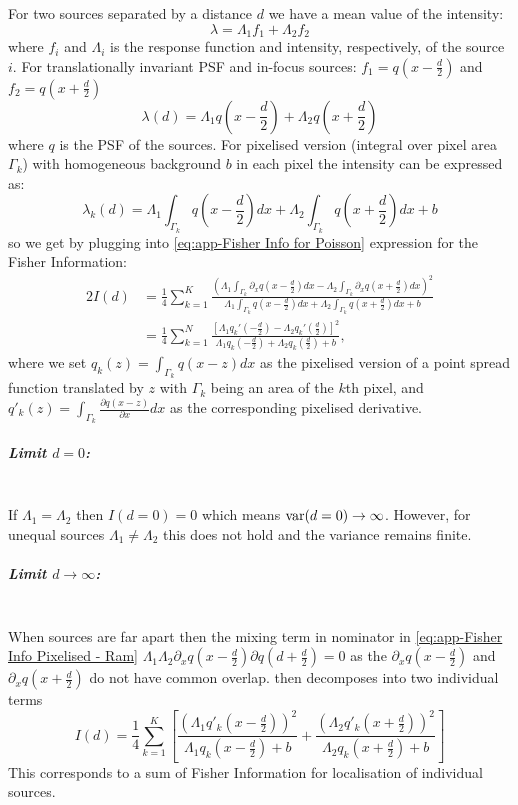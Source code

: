 For two sources separated by a distance $d$ we have a mean value of the intensity:
%
\begin{equation}
	\lambda=\Lambda_1f_1+\Lambda_2f_2
\end{equation}
%
where $f_i$ and $\Lambda_i$ is the response function and intensity, respectively, of the source $i$. For translationally invariant PSF and in-focus sources: $f_1=q(x-\frac{d}{2})$ and $f_2=q(x+\frac{d}{2})$
%
\begin{equation}
	\lambda(d)=\Lambda_1q(x-\frac{d}{2})+\Lambda_2q(x+\frac{d}{2})
	\label{eq:app-expected intensity d/2}
\end{equation}
%
where $q$ is the PSF of the sources. For pixelised version (integral over pixel area $\Gamma_k$) with homogeneous background $b$ in each pixel the intensity can be expressed as:
%
\begin{equation}
	\lambda_k(d)=\Lambda_1\int_{\Gamma_k}q(x-\frac{d}{2})dx+\Lambda_2\int_{\Gamma_k}q(x+\frac{d}{2})dx+b
\end{equation}
%
so we get by plugging into \autoref{eq:app-Fisher Info for Poisson} expression for the Fisher Information:
%
\begin{alignat}{2}
	I(d)
	&=\frac{1}{4}\sum_{k=1}^K\frac{\left(\Lambda_1\int_{\Gamma_k}\partial_{x}q(x-\frac{d}{2})dx-\Lambda_2\int_{\Gamma_k}\partial_{x}q(x+\frac{d}{2})dx\right)^2}{\Lambda_1\int_{\Gamma_k}q(x-\frac{d}{2})dx+\Lambda_2\int_{\Gamma_k}q(x+\frac{d}{2})dx+b}\nonumber\\
	&=\frac{1}{4}\sum_{k=1}^N\frac{\left[\Lambda_1q_k'(-\frac{d}{2})-\Lambda_2q_k'(\frac{d}{2})\right]^2}{\Lambda_1q_k(-\frac{d}{2})+\Lambda_2q_k(\frac{d}{2})+b},
	\label{eq:app-Fisher Info Pixelised - Ram}	
\end{alignat}
%
where we set $q_k(z)=\int_{\Gamma_k}q(x-z)dx$ as the pixelised version of a point spread function translated by $z$ with $\Gamma_k$ being an area of the $k$th pixel, and $q'_k(z)=\int_{\Gamma_k}\frac{\partial q(x-z)}{\partial x}dx$ as the corresponding pixelised derivative.


\subparagraph*{Limit $d=0$:}\ \\
If $\Lambda_1=\Lambda_2$ then $I(d=0)=0$ which means $\mathrm{var}(d=0)\rightarrow\infty$. However, for unequal sources $\Lambda_1\neq\Lambda_2$ this does not hold and the variance remains finite.

\subparagraph*{Limit $d\rightarrow\infty$:}\ \\
When sources are far apart then the mixing term in nominator in \autoref{eq:app-Fisher Info Pixelised - Ram} $\Lambda_1\Lambda_2\partial_{x}q(x-\frac{d}{2})\partial q(d+\frac{d}{2})=0$ as the $\partial_{x}q(x-\frac{d}{2})$ and $\partial_{x}q(x+\frac{d}{2})$ do not have common overlap.  then decomposes into two individual terms
%
\begin{equation*}
	I(d) 
	=\frac{1}{4}\sum_{k=1}^K\left[\frac{\left(\Lambda_1q'_k(x-\frac{d}{2})\right)^2}{\Lambda_1q_k(x-\frac{d}{2})+b}+\frac{\left(\Lambda_2 q'_k(x+\frac{d}{2})\right)^2}{\Lambda_2q_k(x+\frac{d}{2})+b}\right]
\end{equation*}
%
This corresponds to a sum of Fisher Information for localisation of individual sources. 

